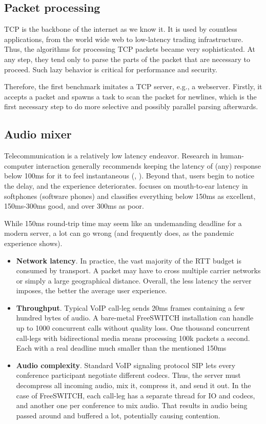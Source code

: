 \documentclass[12pt,a4paper,twoside]{report}
\begin{document}
\subsection{Packet processing}
\label{section:background_packet-processing}
TCP is the backbone of the internet as we know it. It is used by countless applications, from the world wide web to low-latency trading infrastructure. Thus, the algorithms for processing TCP packets became very sophisticated. At any step, they tend only to parse the parts of the packet that are necessary to proceed. Such lazy behavior is critical for performance and security.

Therefore, the first benchmark imitates a TCP server, e.g., a webserver. Firstly, it accepts a packet and spawns a task to scan the packet for newlines, which is the first necessary step to do more selective and possibly parallel parsing afterwards. 

\subsection{Audio mixer}
\label{section:bench-audio-mixer}
Telecommunication is a relatively low latency endeavor. Research in human-computer interaction generally recommends keeping the latency of (any) response below 100ms for it to feel instantaneous (\cite{Miller1968}, \cite{Amin2013}). Beyond that, users begin to notice the delay, and the experience deteriorates. \cite{voip-latency} focuses on mouth-to-ear latency in softphones (software phones) and classifies everything below 150ms as excellent, 150ms-300ms good, and over 300ms as poor. 

While 150ms round-trip time may seem like an undemanding deadline for a modern server, a lot can go wrong (and frequently does, as the pandemic experience shows).  
\begin{itemize}
    \item \textbf{Network latency}. In practice, the vast majority of the RTT budget is consumed by transport. A packet may have to cross multiple carrier networks or simply a large geographical distance. Overall, the less latency the server imposes, the better the average user experience. 
    \item \textbf{Throughput}. Typical VoIP call-leg sends 20ms frames containing a few hundred bytes of audio. A bare-metal FreeSWITCH \cite{Maruzzelli2017-ou} installation can handle up to 1000 concurrent calls without quality loss. One thousand concurrent call-legs with bidirectional media means processing 100k packets a second. Each with a real deadline much smaller than the mentioned 150ms
    \item \textbf{Audio complexity}. Standard VoIP signaling protocol SIP lets every conference participant negotiate different codecs. Thus, the server must decompress all incoming audio, mix it, compress it, and send it out. In the case of FreeSWITCH, each call-leg has a separate thread for IO and codecs, and another one per conference to mix audio. That results in audio being passed around and buffered a lot, potentially causing contention.      
\end{itemize}
\end{document}
